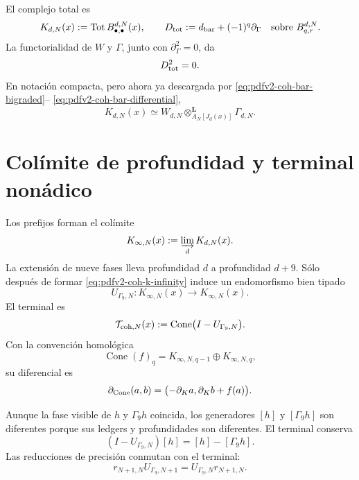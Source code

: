 El complejo total es
\begin{equation}\label{eq:pdfv2-coh-total-complex}
 K_{d,N}(x):=\operatorname{Tot}B_{\bullet,\bullet}^{d,N}(x),
 \qquad
 D_{\rm tot}:=d_{\rm bar}+(-1)^q\partial_\Gamma
 \quad\text{sobre }B_{q,r}^{d,N}.
\end{equation}
La functorialidad de \(W\) y \(\Gamma\), junto con
\(\partial_\Gamma^2=0\), da
\begin{equation}\label{eq:pdfv2-coh-total-square-zero}
 D_{\rm tot}^2=0.
\end{equation}
En notación compacta, pero ahora ya descargada por
\eqref{eq:pdfv2-coh-bar-bigraded}--
\eqref{eq:pdfv2-coh-bar-differential},
\begin{equation}\label{eq:pdfv2-coh-derived-coend}
 K_{d,N}(x)
 \simeq
 W_{d,N}\otimes^{\mathbf L}_{A_N[J_d(x)]}\Gamma_{d,N}.
\end{equation}

\section{Colímite de profundidad y terminal nonádico}
\label{sec:pdfv2-coh-terminal}

Los prefijos forman el colímite
\begin{equation}\label{eq:pdfv2-coh-k-infinity}
 K_{\infty,N}(x):=\varinjlim_d K_{d,N}(x).
\end{equation}
La extensión de nueve fases lleva profundidad \(d\) a profundidad \(d+9\).
Sólo después de formar \eqref{eq:pdfv2-coh-k-infinity} induce un
endomorfismo bien tipado
\begin{equation}\label{eq:pdfv2-coh-u-gamma9}
 U_{\Gamma_9,N}:K_{\infty,N}(x)
 \longrightarrow K_{\infty,N}(x).
\end{equation}
El terminal es
\begin{equation}\label{eq:pdfv2-coh-terminal-cone}
 \mathcal T_{{\rm coh},N}(x)
 :=\operatorname{Cone}\bigl(I-U_{\Gamma_9,N}\bigr).
\end{equation}
Con la convención homológica
\[
 \operatorname{Cone}(f)_q
 =K_{\infty,N,q-1}\oplus K_{\infty,N,q},
\]
su diferencial es
\begin{equation}\label{eq:pdfv2-coh-cone-differential}
 \partial_{\rm Cone}(a,b)
 =\bigl(-\partial_Ka,\partial_Kb+f(a)\bigr).
\end{equation}

Aunque la fase visible de \(h\) y \(\Gamma_9h\) coincida, los generadores
\([h]\) y \([\Gamma_9h]\) son diferentes porque sus ledgers y profundidades
son diferentes. El terminal conserva
\begin{equation}\label{eq:pdfv2-coh-terminal-difference}
 (I-U_{\Gamma_9,N})[h]=[h]-[\Gamma_9h].
\end{equation}
Las reducciones de precisión conmutan con el terminal:
\begin{equation}\label{eq:pdfv2-coh-u-reduction}
 r_{N+1,N}U_{\Gamma_9,N+1}
 =U_{\Gamma_9,N}r_{N+1,N}.
\end{equation}

